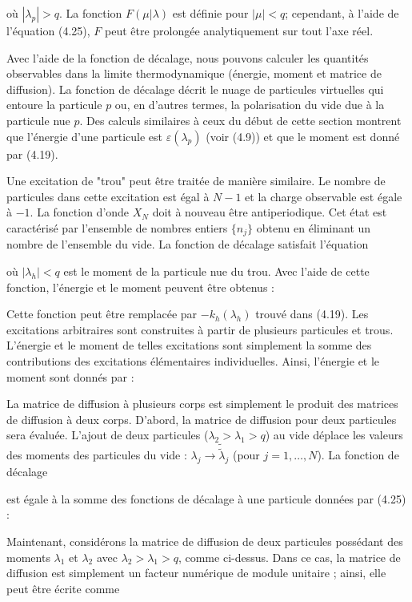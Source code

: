 où \( |\lambda_p | > q \). La fonction \( F(\mu|\lambda) \) est définie pour \( |\mu| < q \); cependant, à l'aide de l'équation (4.25), \( F \) peut être prolongée analytiquement sur tout l'axe réel.

Avec l'aide de la fonction de décalage, nous pouvons calculer les quantités observables dans la limite thermodynamique (énergie, moment et matrice de diffusion). La fonction de décalage décrit le nuage de particules virtuelles qui entoure la particule \( p \) ou, en d'autres termes, la polarisation du vide due à la particule nue \( p \). Des calculs similaires à ceux du début de cette section montrent que l'énergie d'une particule est \( \varepsilon(\lambda_p) \) (voir (4.9)) et que le moment est donné par (4.19).

Une excitation de "trou" peut être traitée de manière similaire. Le nombre de particules dans cette excitation est égal à \( N - 1 \) et la charge observable est égale à \( -1 \). La fonction d'onde \( X_N \) doit à nouveau être antiperiodique. Cet état est caractérisé par l'ensemble de nombres entiers \( \{n_j\} \) obtenu en éliminant un nombre de l'ensemble du vide. La fonction de décalage satisfait l'équation

où \( | \lambda_h | < q \) est le moment de la particule nue du trou. Avec l'aide de cette fonction, l'énergie et le moment peuvent être obtenus :


Cette fonction peut être remplacée par \( -k_h(\lambda_h) \) trouvé dans (4.19).
Les excitations arbitraires sont construites à partir de plusieurs particules et trous.
L'énergie et le moment de telles excitations sont simplement la somme des contributions des excitations élémentaires individuelles. Ainsi, l'énergie et le moment sont donnés par :


La matrice de diffusion à plusieurs corps est simplement le produit des matrices de diffusion à deux corps. D'abord, la matrice de diffusion pour deux particules sera évaluée. L'ajout de deux particules (\( \lambda_2 > \lambda_1 > q \)) au vide déplace les valeurs des moments des particules du vide : \( \lambda_j \rightarrow \tilde{\tilde{\lambda}}_j \) (pour \( j = 1, \ldots, N \)). La fonction de décalage

est égale à la somme des fonctions de décalage à une particule données par (4.25) :

Maintenant, considérons la matrice de diffusion de deux particules possédant des moments \( \lambda_1 \) et \( \lambda_2 \) avec \( \lambda_2 > \lambda_1 > q \), comme ci-dessus. Dans ce cas, la matrice de diffusion est simplement un facteur numérique de module unitaire ; ainsi, elle peut être écrite comme


